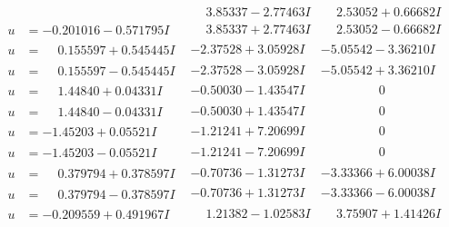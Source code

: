 \documentclass[1p]{elsarticle_modified}
\theoremstyle{definition}
\begin{document}
$$\begin{array}{c|c|c}
 & \phantom{-}3.85337 - 2.77463 I & \phantom{-}2.53052 + 0.66682 I \\ \hline\begin{aligned}
u &= -0.201016 - 0.571795 I\end{aligned}
 & \phantom{-}3.85337 + 2.77463 I & \phantom{-}2.53052 - 0.66682 I \\ \hline\begin{aligned}
u &= \phantom{-}0.155597 + 0.545445 I\end{aligned}
 & -2.37528 + 3.05928 I & -5.05542 - 3.36210 I \\ \hline\begin{aligned}
u &= \phantom{-}0.155597 - 0.545445 I\end{aligned}
 & -2.37528 - 3.05928 I & -5.05542 + 3.36210 I \\ \hline\begin{aligned}
u &= \phantom{-}1.44840 + 0.04331 I\end{aligned}
 & -0.50030 - 1.43547 I & \phantom{-0.000000 } 0 \\ \hline\begin{aligned}
u &= \phantom{-}1.44840 - 0.04331 I\end{aligned}
 & -0.50030 + 1.43547 I & \phantom{-0.000000 } 0 \\ \hline\begin{aligned}
u &= -1.45203 + 0.05521 I\end{aligned}
 & -1.21241 + 7.20699 I & \phantom{-0.000000 } 0 \\ \hline\begin{aligned}
u &= -1.45203 - 0.05521 I\end{aligned}
 & -1.21241 - 7.20699 I & \phantom{-0.000000 } 0 \\ \hline\begin{aligned}
u &= \phantom{-}0.379794 + 0.378597 I\end{aligned}
 & -0.70736 - 1.31273 I & -3.33366 + 6.00038 I \\ \hline\begin{aligned}
u &= \phantom{-}0.379794 - 0.378597 I\end{aligned}
 & -0.70736 + 1.31273 I & -3.33366 - 6.00038 I \\ \hline\begin{aligned}
u &= -0.209559 + 0.491967 I\end{aligned}
 & \phantom{-}1.21382 - 1.02583 I & \phantom{-}3.75907 + 1.41426 I \\ \hline\begin{aligned}

\end{aligned}
\end{array}$$
\end{document}
